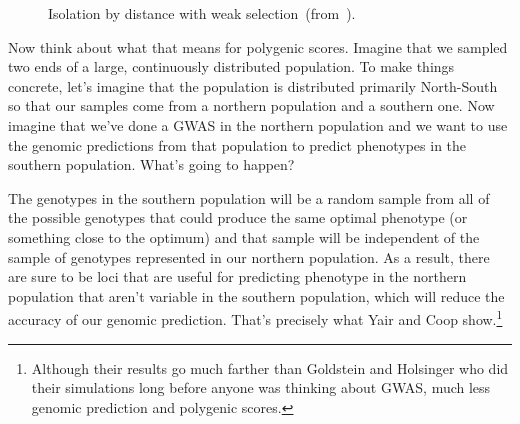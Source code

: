 \documentclass[12pt]{article}
\begin{document}
\begin{figure}
\begin{center}
\end{center}
\caption{Isolation by distance with weak
  selection~(from~\cite{Goldstein-Holsinger-1992}).}\label{fig:isolation-by-distance}
\end{figure}

Now think about what that means for polygenic scores. Imagine that we
sampled two ends of a large, continuously distributed population. To
make things concrete, let's imagine that the population is distributed
primarily North-South so that our samples come from a northern
population and a southern one. Now imagine that we've done a GWAS in
the northern population and we want to use the genomic predictions
from that population to predict phenotypes in the southern
population. What's going to happen?

The genotypes in the southern population will be a random sample from
all of the possible genotypes that could produce the same optimal
phenotype (or something close to the optimum) and that sample will be
independent of the sample of genotypes represented in our northern
population. As a result, there are sure to be loci that are useful for
predicting phenotype in the northern population that aren't variable
in the southern population, which will reduce the accuracy of our
genomic prediction. That's precisely what Yair and Coop
show.\footnote{Although their results go much farther than Goldstein
  and Holsinger who did their simulations long before anyone was
  thinking about GWAS, much less genomic prediction and polygenic
  scores.}
\end{document}
